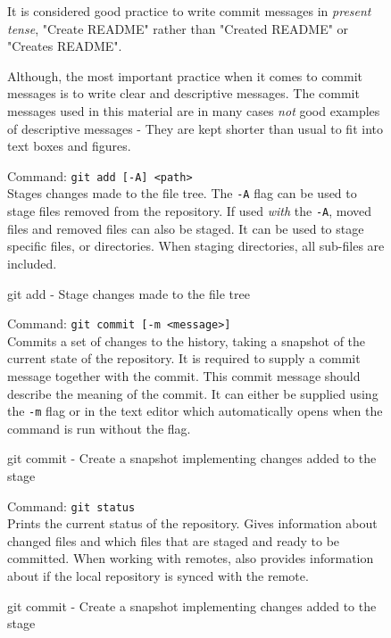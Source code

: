 \documentclass[../main/git_course_main.tex]{subfiles}
\begin{document}
\begin{figure}[h!]
\begin{redbox}
It is considered good practice to write commit messages in \textit{present tense},
"Create README" rather than "Created README" or "Creates README".

Although, the most important practice when it comes to commit messages is to write
clear and descriptive messages. The commit messages used in this material are in
many cases \textit{not} good examples of descriptive messages - They are kept shorter than usual to fit into text boxes and figures.
\end{redbox}
\end{figure}

\begin{figure}[h!]
\begin{bluebox}
Command: \verb$git add [-A] <path>$ \\

Stages changes made to the file tree. The \verb$-A$ flag can be used to stage files removed from the repository.
If used \textit{with} the \verb$-A$, moved files and removed files can also be staged.
It can be used to stage specific files, or directories. When staging directories, all sub-files are
included.
\end{bluebox}
\label{command:add}
\caption{git add - Stage changes made to the file tree}
\end{figure}

\begin{figure}[h!]
\begin{bluebox}
Command: \verb$git commit [-m <message>]$ \\

Commits a set of changes to the history, taking a snapshot of the current state of the repository.
It is required to supply a commit message together with the commit. This commit message should describe the meaning of the commit. It can either be supplied using the \verb$-m$ flag or in the text editor which automatically opens when the command is run without the flag. 
\end{bluebox}
\label{command:commit}
\caption{git commit - Create a snapshot implementing changes added to the stage}
\end{figure}

\begin{figure}[h!]
\begin{bluebox}
Command: \verb$git status$ \\

Prints the current status of the repository. Gives information about changed files
and which files that are staged and ready to be committed. When working with remotes,
also provides information about if the local repository is synced with the remote.
\end{bluebox}
\label{command:commit}
\caption{git commit - Create a snapshot implementing changes added to the stage}
\end{figure}
\end{document}
